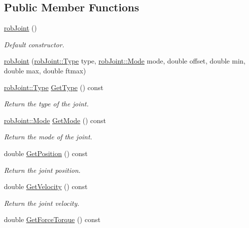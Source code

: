 \subsection*{Public Member Functions}
\begin{DoxyCompactItemize}
\item 
\hyperlink{classrob_joint_a62338efa956ba74c53fa5a8a8dd94a56}{rob\+Joint} ()
\begin{DoxyCompactList}\small\item\em Default constructor. \end{DoxyCompactList}\item 
\hyperlink{classrob_joint_a9ae7ed701bcaa0c0b5efa1e84f9409a9}{rob\+Joint} (\hyperlink{classrob_joint_a558d78a642cf2101aceddce0d82379b6}{rob\+Joint\+::\+Type} type, \hyperlink{classrob_joint_a7f77320bad87c259f71c18443f7bdd9c}{rob\+Joint\+::\+Mode} mode, double offset, double min, double max, double ftmax)
\item 
\hyperlink{classrob_joint_a558d78a642cf2101aceddce0d82379b6}{rob\+Joint\+::\+Type} \hyperlink{classrob_joint_a94377ddc42472101b84ab0f8c09ed889}{Get\+Type} () const 
\begin{DoxyCompactList}\small\item\em Return the type of the joint. \end{DoxyCompactList}\item 
\hyperlink{classrob_joint_a7f77320bad87c259f71c18443f7bdd9c}{rob\+Joint\+::\+Mode} \hyperlink{classrob_joint_aec5d8f6b85cc25adffad894bb2720474}{Get\+Mode} () const 
\begin{DoxyCompactList}\small\item\em Return the mode of the joint. \end{DoxyCompactList}\item 
double \hyperlink{classrob_joint_a13eefeaca37864ffe2e16273af28bd5d}{Get\+Position} () const 
\begin{DoxyCompactList}\small\item\em Return the joint position. \end{DoxyCompactList}\item 
double \hyperlink{classrob_joint_a1109748d5ebf7800922671978e54841a}{Get\+Velocity} () const 
\begin{DoxyCompactList}\small\item\em Return the joint velocity. \end{DoxyCompactList}\item 
double \hyperlink{classrob_joint_a8a92e06af4eb9b88d3027b8208472a32}{Get\+Force\+Torque} () const 

\end{DoxyCompactItemize}
